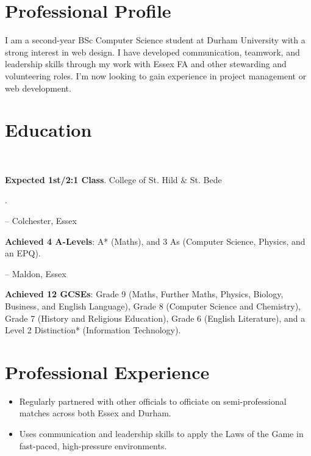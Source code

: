 \section*{Professional Profile}

\noindent I am a second-year BSc Computer Science student at Durham University with a strong interest in web design. I have developed communication, teamwork, and leadership skills through my work with Essex FA and other stewarding and volunteering roles. I'm now looking to gain experience in project management or web development.

\section*{Education}

\\\begin{small}\textbf{Expected 1st/2:1 Class}. College of St. Hild $\&$ St. Bede\end{small}.

 -- Colchester, Essex
\\\begin{small}\textbf{Achieved 4 A-Levels}: A* (Maths), and 3 As (Computer Science, Physics, and an EPQ).\end{small}

 -- Maldon, Essex
\\\begin{small}\textbf{Achieved 12 GCSEs}: Grade 9 (Maths, Further Maths, Physics, Biology, Business, and English Language), Grade 8 (Computer Science and Chemistry), Grade 7 (History and Religious Education), Grade 6 (English Literature), and a Level 2 Distinction* (Information Technology).\end{small}

\section*{Professional Experience}

\begin{itemize}
    \item Regularly partnered with other officials to officiate on semi-professional matches across both Essex and Durham.
    \item Uses communication and leadership skills to apply the Laws of the Game in fast-paced, high-pressure environments.
\end{itemize}

